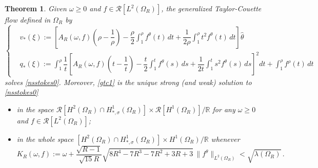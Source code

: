 \documentclass[a4paper,11pt]{article}
\newtheorem{theorem}{Theorem}[section]
\numberwithin{equation}{section}
\numberwithin{figure}{section}
\begin{document}
\begin{theorem}\label{UVconstant0}
Given $\omega\ge0$ and $f \in \mathcal{R}[L^{2}(\Omega_{R})]$, the generalized Taylor-Couette flow defined in $\Omega_{R}$ by
\begin{equation} \label{gtc1}
\left\{
\begin{aligned}
& v_{*}(\xi) := \left[ A_{R}(\omega,f) \left( \rho - \dfrac{1}{\rho} \right) - \dfrac{\rho}{2} \int_{1}^{\rho} f^{\theta}(t) \, dt +
\dfrac{1}{2\rho} \int_{1}^{\rho} t^{2} f^{\theta}(t) \, dt \right] \widehat{\theta} \\[6pt]
& q_{*}(\xi) := \int_{1}^{\rho} \dfrac{1}{t} \left[ A_{R}(\omega,f) \left( t - \dfrac{1}{t} \right) - \dfrac{t}{2} \int_{1}^{t} f^{\theta}(s)
\, ds + \dfrac{1}{2t} \int_{1}^{t} s^{2} f^{\theta}(s) \, ds \right]^{2} dt +  \int_{1}^{\rho} f^{\rho}(t) \, dt
\end{aligned}
\right.
\end{equation}
solves \eqref{nsstokes0}. Moreover, \eqref{gtc1} is the unique strong (and weak) solution to \eqref{nsstokes0}
\begin{itemize}
\item in the space $\mathcal{R}[H^{2}(\Omega_{R}) \cap H^{1}_{*,\sigma}(\Omega_{R}) ] \times \mathcal{R}[H^{1}(\Omega_{R})]/\mathbb{R}$ for any $\omega \geq 0$ and $f \in \mathcal{R}[L^{2}(\Omega_{R})]$;

\item in the whole space $[H^{2}(\Omega_{R}) \cap H^{1}_{*,\sigma}(\Omega_{R})] \times H^{1}(\Omega_{R})/\mathbb{R}$ whenever
\begin{equation} \label{umbral1cor}
K_R(\omega,f) := \omega+\frac{\sqrt{R-1}}{\sqrt{15}R}\sqrt{8R^4-7R^3-7R^2+3R+3}\, \|f^\theta\|_{L^2(\Omega_R)}<\sqrt{\lambda(\Omega_R)}\, .
\end{equation}
\end{itemize}
\end{theorem}
\noindent
\end{document}
